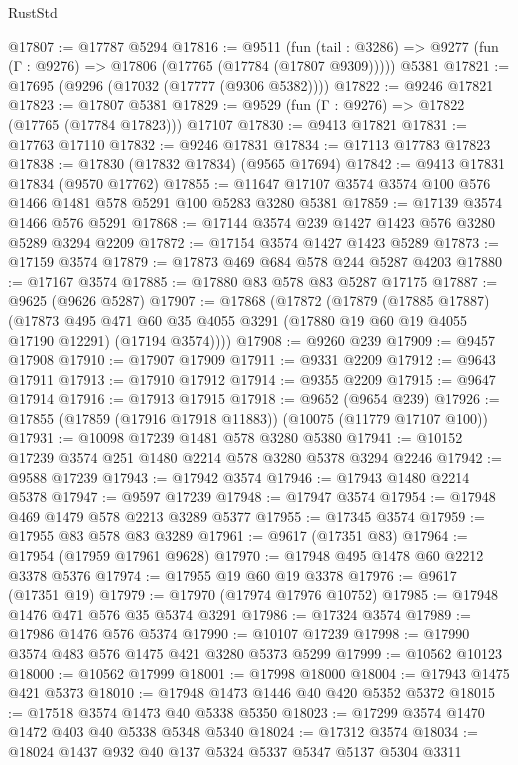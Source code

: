 \begin{lexlean}{RustStd}
\begin{coremodule}
{\begin{coremodule}
{{{{{{{{{{{{{{{{{{{{{{{{{{{{{{{{{@17807 := @17787 @5294
@17816 := @9511
    (fun (tail : @3286) => @9277 (fun (Γ : @9276) => @17806 (@17765 (@17784 (@17807 @9309)))))
    @5381
@17821 := @17695 (@9296 (@17032 (@17777 (@9306 @5382))))
@17822 := @9246 @17821
@17823 := @17807 @5381
@17829 := @9529 (fun (Γ : @9276) => @17822 (@17765 (@17784 @17823))) @17107
@17830 := @9413 @17821
@17831 := @17763 @17110
@17832 := @9246 @17831
@17834 := @17113 @17783 @17823
@17838 := @17830 (@17832 @17834) (@9565 @17694)
@17842 := @9413 @17831 @17834 (@9570 @17762)
@17855 := @11647 @17107 @3574 @3574 @100 @576 @1466 @1481 @578 @5291 @100 @5283 @3280 @5381
@17859 := @17139 @3574 @1466 @576 @5291
@17868 := @17144 @3574 @239 @1427 @1423 @576 @3280 @5289 @3294 @2209
@17872 := @17154 @3574 @1427 @1423 @5289
@17873 := @17159 @3574
@17879 := @17873 @469 @684 @578 @244 @5287 @4203
@17880 := @17167 @3574
@17885 := @17880 @83 @578 @83 @5287 @17175
@17887 := @9625 (@9626 @5287)
@17907 := @17868
    (@17872
      (@17879
        (@17885 @17887)
        (@17873
          @495
          @471
          @60
          @35
          @4055
          @3291
          (@17880 @19 @60 @19 @4055 @17190 @12291)
          (@17194 @3574))))
@17908 := @9260 @239
@17909 := @9457 @17908
@17910 := @17907 @17909
@17911 := @9331 @2209
@17912 := @9643 @17911
@17913 := @17910 @17912
@17914 := @9355 @2209
@17915 := @9647 @17914
@17916 := @17913 @17915
@17918 := @9652 (@9654 @239)
@17926 := @17855 (@17859 (@17916 @17918 @11883)) (@10075 (@11779 @17107 @100))
@17931 := @10098 @17239 @1481 @578 @3280 @5380
@17941 := @10152 @17239 @3574 @251 @1480 @2214 @578 @3280 @5378 @3294 @2246
@17942 := @9588 @17239
@17943 := @17942 @3574
@17946 := @17943 @1480 @2214 @5378
@17947 := @9597 @17239
@17948 := @17947 @3574
@17954 := @17948 @469 @1479 @578 @2213 @3289 @5377
@17955 := @17345 @3574
@17959 := @17955 @83 @578 @83 @3289
@17961 := @9617 (@17351 @83)
@17964 := @17954 (@17959 @17961 @9628)
@17970 := @17948 @495 @1478 @60 @2212 @3378 @5376
@17974 := @17955 @19 @60 @19 @3378
@17976 := @9617 (@17351 @19)
@17979 := @17970 (@17974 @17976 @10752)
@17985 := @17948 @1476 @471 @576 @35 @5374 @3291
@17986 := @17324 @3574
@17989 := @17986 @1476 @576 @5374
@17990 := @10107 @17239
@17998 := @17990 @3574 @483 @576 @1475 @421 @3280 @5373 @5299
@17999 := @10562 @10123
@18000 := @10562 @17999
@18001 := @17998 @18000
@18004 := @17943 @1475 @421 @5373
@18010 := @17948 @1473 @1446 @40 @420 @5352 @5372
@18015 := @17518 @3574 @1473 @40 @5338 @5350
@18023 := @17299 @3574 @1470 @1472 @403 @40 @5338 @5348 @5340
@18024 := @17312 @3574
@18034 := @18024 @1437 @932 @40 @137 @5324 @5337 @5347 @5137 @5304 @3311
}}}}}}}}}}}}}}}}}}}}}}}}}}}}}}}}}
\end{coremodule}}
\end{coremodule}
\end{lexlean}
